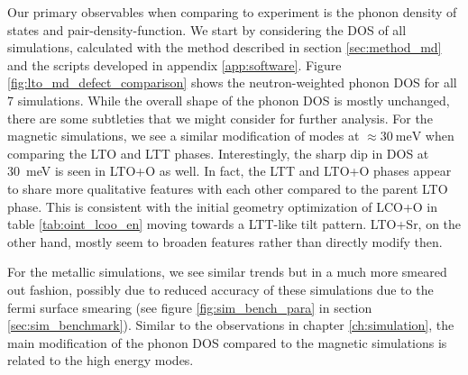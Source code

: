 Our primary observables when comparing to experiment is the phonon density of states and pair-density-function. We start by considering the DOS of all simulations, calculated with the method described in section \ref{sec:method_md} and the scripts developed in appendix \ref{app:software}. Figure \ref{fig:lto_md_defect_comparison} shows the neutron-weighted phonon DOS for all 7 simulations. While the overall shape of the phonon DOS is mostly unchanged, there are some subtleties that we might consider for further analysis. For the magnetic simulations, we see a similar modification of modes at $\approx \SI{30}{\milli\eV}$ when comparing the LTO and LTT phases. Interestingly, the sharp dip in DOS at \SI{30}{\milli\eV} is seen in LTO+O as well. In fact, the LTT and LTO+O phases appear to share more qualitative features with each other compared to the parent LTO phase. This is consistent with the initial geometry optimization of LCO+O in table \ref{tab:oint_lcoo_en} moving towards a LTT-like tilt pattern. LTO+Sr, on the other hand, mostly seem to broaden features rather than directly modify then. 

For the metallic simulations, we see similar trends but in a much more smeared out fashion, possibly due to reduced accuracy of these simulations due to the fermi surface smearing (see figure \ref{fig:sim_bench_para} in section \ref{sec:sim_benchmark}). Similar to the observations in chapter \ref{ch:simulation}, the main modification of the phonon DOS compared to the magnetic simulations is related to the high energy modes.

